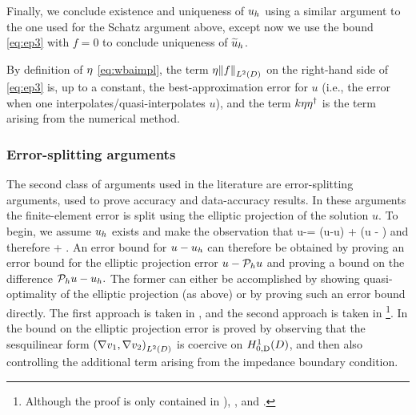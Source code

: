 Finally, we conclude existence and uniqueness of $u_{h}$ using a similar argument to the one used for the Schatz argument above, except now we use the bound \cref{eq:ep3} with $f = 0$ to conclude uniqueness of $\widetilde{u}_{h}$.

By definition of $\eta$ \cref{eq:wbaimpl}, the term $\wba\NLtD{f}$ on the right-hand side of \cref{eq:ep3} is, up to a constant, the best-approximation error for $u$ (i.e., the error when one interpolates/quasi-interpolates $u$), and the term $k\eta\eta^{\dagger}$ is the  term arising from the numerical method.%
\subsubsection{Error-splitting arguments}\label{sec:errorsplit}
The second class of arguments used in the literature are error-splitting arguments, used to prove accuracy and data-accuracy results. In these arguments the finite-element error is split using the elliptic projection of the solution $u$. To begin, we assume $u_{h}$ exists and make the observation that
\beqs\label{eq:split1}
u-\uh = \mleft(u-\Ph u\mright) + \mleft(\Ph u - \uh\mright)
\eeqs
and therefore
\beqs
{} \leq {} + .
\eeqs
An error bound for $u-u_{h}$ can therefore be obtained by proving an error bound for the elliptic projection error $u- \mathcal P_{h} u$ and proving a bound on the difference $\mathcal P_{h} u - u_{h}.$ The former can either be accomplished by showing quasi-optimality of the elliptic projection (as above) or by proving such an error bound directly. The first approach is taken in \cite{DuWu:15,ChGaNiTo:18,LiWu:19}, and the second approach is taken in \cite[Lemma 5.2]{FeWu:09}\footnote{Although the proof is only contained in \cite[Lemma 5.2]{FeWu:08}), \cite[Lemma 4.3]{FeWu:11}, and \cite[Lemma 4.2]{Wu:14}.}. In \cite{FeWu:09,FeWu:11,Wu:14} the bound on the elliptic projection error is proved by observing that the sesquilinear form $\IPLtD{\grad \vo}{\grad \vt}$ is coercive on $\HozDD$, and then also controlling the additional term arising from the impedance boundary condition.

